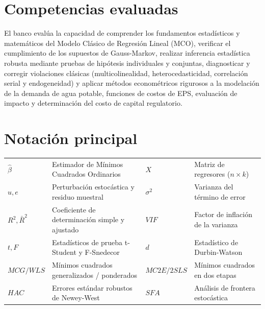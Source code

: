 \documentclass[11pt,a4paper]{article}
\newcounter{qnum}
\begin{document}
\section*{Competencias evaluadas}

\noindent El banco evalúa la capacidad de comprender los fundamentos estadísticos y matemáticos del Modelo Clásico de Regresión Lineal (MCO), verificar el cumplimiento de los supuestos de Gauss-Markov, realizar inferencia estadística robusta mediante pruebas de hipótesis individuales y conjuntas, diagnosticar y corregir violaciones clásicas (multicolinealidad, heterocedasticidad, correlación serial y endogeneidad) y aplicar métodos econométricos rigurosos a la modelación de la demanda de agua potable, funciones de costos de EPS, evaluación de impacto y determinación del costo de capital regulatorio.

\section*{Notación principal}

{\small
\renewcommand{\arraystretch}{1.0}
\begin{center}
\begin{tabular}{@{}ll@{\hspace{1.0cm}}ll@{}}
\toprule
$\hat{\beta}$ & Estimador de Mínimos Cuadrados Ordinarios & $X$ & Matriz de regresores ($n \times k$) \\
$u, e$ & Perturbación estocástica y residuo muestral & $\sigma^2$ & Varianza del término de error \\
$R^2, \bar{R}^2$ & Coeficiente de determinación simple y ajustado & $VIF$ & Factor de inflación de la varianza \\
$t, F$ & Estadísticos de prueba t-Student y F-Snedecor & $d$ & Estadístico de Durbin-Watson \\
$MCG / WLS$ & Mínimos cuadrados generalizados / ponderados & $MC2E / 2SLS$ & Mínimos cuadrados en dos etapas \\
$HAC$ & Errores estándar robustos de Newey-West & $SFA$ & Análisis de frontera estocástica \\
\bottomrule
\end{tabular}
\end{center}
}

\newpage
\setcounter{qnum}{0}







\end{document}
